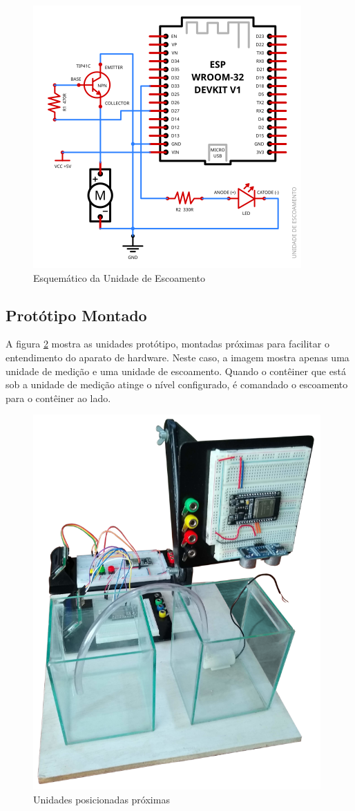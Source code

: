 \begin{figure}[h!]
    \centering
    \includegraphics[width=0.5\linewidth]{diagrama-unidade-escoamento.png}
    \caption{Esquemático da Unidade de Escoamento}
    \label{fig:schematic-pump-unit}
\end{figure}

\subsection{Protótipo Montado}
A figura \ref{fig:mounted-aparatus} mostra as unidades protótipo, montadas próximas para facilitar o entendimento do aparato de hardware. Neste caso, a imagem mostra apenas uma unidade de medição e uma unidade de escoamento. Quando o contêiner que está sob a unidade de medição atinge o nível configurado, é comandado o escoamento para o contêiner ao lado.

\begin{figure}[h!]
    \centering
    \includegraphics[width=11cm]{imagem/prototipo-montado-1.png}
    \caption{Unidades posicionadas próximas}
    \label{fig:mounted-aparatus}
\end{figure}

